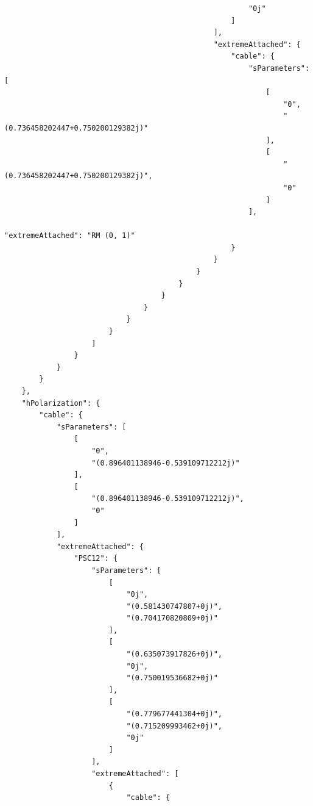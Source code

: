 \begin{verbatim}
                                                        "0j"
                                                    ]
                                                ],
                                                "extremeAttached": {
                                                    "cable": {
                                                        "sParameters": [
                                                            [
                                                                "0",
                                                                "(0.736458202447+0.750200129382j)"
                                                            ],
                                                            [
                                                                "(0.736458202447+0.750200129382j)",
                                                                "0"
                                                            ]
                                                        ],
                                                        "extremeAttached": "RM (0, 1)"
                                                    }
                                                }
                                            }
                                        }
                                    }
                                }
                            }
                        }
                    ]
                }
            }
        }
    },
    "hPolarization": {
        "cable": {
            "sParameters": [
                [
                    "0",
                    "(0.896401138946-0.539109712212j)"
                ],
                [
                    "(0.896401138946-0.539109712212j)",
                    "0"
                ]
            ],
            "extremeAttached": {
                "PSC12": {
                    "sParameters": [
                        [
                            "0j",
                            "(0.581430747807+0j)",
                            "(0.704170820809+0j)"
                        ],
                        [
                            "(0.635073917826+0j)",
                            "0j",
                            "(0.750019536682+0j)"
                        ],
                        [
                            "(0.779677441304+0j)",
                            "(0.715209993462+0j)",
                            "0j"
                        ]
                    ],
                    "extremeAttached": [
                        {
                            "cable": {

\end{verbatim}
